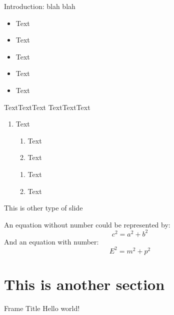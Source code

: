 \documentclass[14pt,xcolor=svgnames]{beamer} %
\begin{document}
\begin{frame}[fragile]{Introduction: blah blah} %

\begin{itemize} %
 \item[\ding{51}]Text
	\item[\ding{56}] Text
	\item[\ding{43}] Text
	\item[\ding{118}] Text
	\item[\ding{48}] Text

\end{itemize}
TextTextText
TextTextText
\begin{enumerate}[label=(\Alph*)]
	\item Text
\begin{enumerate}[label=\Roman*.]
	\item Text
	\item Text
\end{enumerate}	
\begin{enumerate}[label=\arabic*.]
	\item Text
	\item Text
\end{enumerate}	
\end{enumerate}

\end{frame}

\begin{frame}[standout]{This is other type of slide}

An equation without number could be represented by:
\begin{equation*}
	c^{2} = a^{2} + b^{2}
\end{equation*}
And an equation with number:
\begin{equation}
E^{2} = m^{2} + p^{2}
\end{equation}
\end{frame}


\section{This is another section}
\begin{frame}{Frame Title} %
Hello world!
\end{frame}
\end{document}
